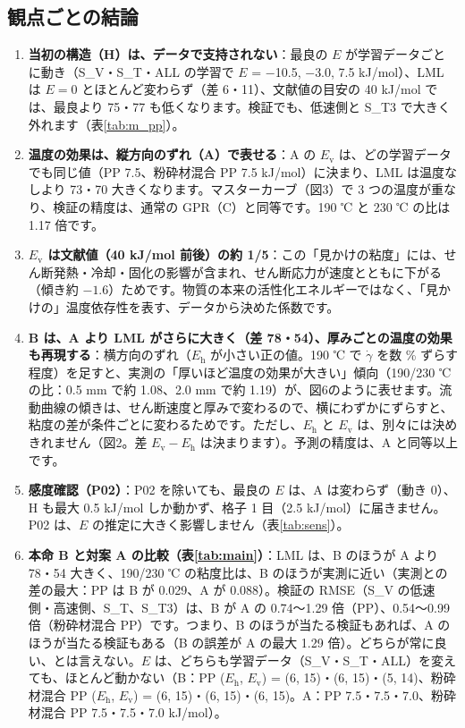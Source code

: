 \documentclass[paper=a4paper,fontsize=10.5pt,line_length=44zw,number_of_lines=38]{jlreq}
\newcommand{\gd}{\dot{\gamma}}
\newcommand{\Eh}{E_{\mathrm{h}}}
\newcommand{\Ev}{E_{\mathrm{v}}}
\begin{document}
\subsection{観点ごとの結論}
\begin{enumerate}[itemsep=0.6ex,topsep=0.6ex]
\item \textbf{当初の構造（H）は、データで支持されない}：最良の $E$ が学習データごとに動き（S\_V・S\_T・ALL の学習で $E$ = $-$10.5, $-$3.0, 7.5 kJ/mol）、LML は $E=0$ とほとんど変わらず（差 6・11）、文献値の目安の 40 kJ/mol では、最良より 75・77 も低くなります。検証でも、低速側と S\_T3 で大きく外れます（表\ref{tab:m_pp}）。
\item \textbf{温度の効果は、縦方向のずれ（A）で表せる}：A の $\Ev$ は、どの学習データでも同じ値（PP 7.5、粉砕材混合 PP 7.5 kJ/mol）に決まり、LML は温度なしより 73・70 大きくなります。マスターカーブ（図3）で 3 つの温度が重なり、検証の精度は、通常の GPR（C）と同等です。190 ℃ と 230 ℃ の比は 1.17 倍です。
\item \textbf{$\Ev$ は文献値（40 kJ/mol 前後）の約 1/5}：この「見かけの粘度」には、せん断発熱・冷却・固化の影響が含まれ、せん断応力が速度とともに下がる（傾き約 $-1.6$）ためです。物質の本来の活性化エネルギーではなく、「見かけの」温度依存性を表す、データから決めた係数です。
\item \textbf{B は、A より LML がさらに大きく（差 78・54）、厚みごとの温度の効果も再現する}：横方向のずれ（$\Eh$ が小さい正の値。190 ℃ で $\gd$ を数 \% ずらす程度）を足すと、実測の「厚いほど温度の効果が大きい」傾向（190/230 ℃ の比：0.5 mm で約 1.08、2.0 mm で約 1.19）が、図6のように表せます。流動曲線の傾きは、せん断速度と厚みで変わるので、横にわずかにずらすと、粘度の差が条件ごとに変わるためです。ただし、$\Eh$ と $\Ev$ は、別々には決めきれません（図2。差 $\Ev-\Eh$ は決まります）。予測の精度は、A と同等以上です。
\item \textbf{感度確認（P02）}：P02 を除いても、最良の $E$ は、A は変わらず（動き 0）、H も最大 0.5 kJ/mol しか動かず、格子 1 目（2.5 kJ/mol）に届きません。P02 は、$E$ の推定に大きく影響しません（表\ref{tab:sens}）。
\item \textbf{本命 B と対案 A の比較（表\ref{tab:main}）}：LML は、B のほうが A より 78・54 大きく、190/230 ℃ の粘度比は、B のほうが実測に近い（実測との差の最大：PP は B が 0.029、A が 0.088）。検証の RMSE（S\_V の低速側・高速側、S\_T、S\_T3）は、B が A の 0.74〜1.29 倍（PP）、0.54〜0.99 倍（粉砕材混合 PP）です。つまり、B のほうが当たる検証もあれば、A のほうが当たる検証もある（B の誤差が A の最大 1.29 倍）。どちらが常に良い、とは言えない。$E$ は、どちらも学習データ（S\_V・S\_T・ALL）を変えても、ほとんど動かない（B：PP ($\Eh$, $\Ev$) = (6, 15)・(6, 15)・(5, 14)、粉砕材混合 PP ($\Eh$, $\Ev$) = (6, 15)・(6, 15)・(6, 15)。A：PP 7.5・7.5・7.0、粉砕材混合 PP 7.5・7.5・7.0 kJ/mol）。

\end{enumerate}
\end{document}
